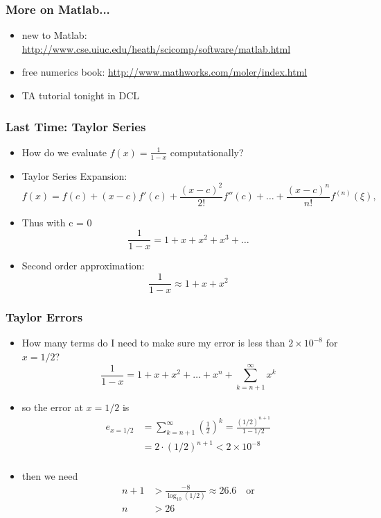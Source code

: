 \documentclass[10pt]{beamer}
\begin{document}
\begin{frame}
\frametitle{More on Matlab...}
\begin{itemize}
\item new to Matlab: {\url{http://www.cse.uiuc.edu/heath/scicomp/software/matlab.html}}
\item free numerics book: {\url{http://www.mathworks.com/moler/index.html}}
\item TA tutorial tonight in DCL
\end{itemize}
\end{frame}
\begin{frame}
\frametitle{Last Time: Taylor Series}
\begin{itemize}
  \item How do we evaluate $f(x) = \frac{1}{1-x}$ computationally?
  \item Taylor Series Expansion:
\begin{equation*}
    f(x) = f(c) + (x-c) f'(c) + \frac{(x-c)^2}{2!} f''(c) + \dots +
\frac{(x-c)^n}{n!} f^{(n)}(\xi),
\end{equation*}
  \item Thus with c = 0
  \begin{equation*}
  \frac{1}{1-x} = 1 + x + x^2 + x^3 + \dots
\end{equation*}
  \item Second order approximation:
  \begin{equation*}
  \frac{1}{1-x} \approx 1 + x + x^2
\end{equation*}
\end{itemize}
\end{frame}
\begin{frame}
\frametitle{Taylor Errors}
\begin{itemize}
  \item How many terms do I need to make sure my error is less than
$2 \times 10^{-8}$ for $x=1/2$?
  \begin{equation*}
  \frac{1}{1-x} = 1 + x + x^2 + \dots + x^{n} + \sum_{k=n+1}^{\infty} x^k
  \end{equation*}
  \item so the error at $x=1/2$ is
  \begin{align*}
  e_{x=1/2} & = \sum_{k=n+1}^{\infty} \left(\frac{1}{2}\right)^k
            = \frac{(1/2)^{n+1}}{1-1/2}\\
            & = 2\cdot(1/2)^{n+1} < 2\times 10^{-8}\\
  \end{align*}
  \item then we need
    \begin{align*}
      n+1 & > \frac{-8}{\log_{10}(1/2)} \approx 26.6\quad\text{or}\\
      n &> 26
\end{align*}
\end{itemize}
\end{frame}
\end{document}
